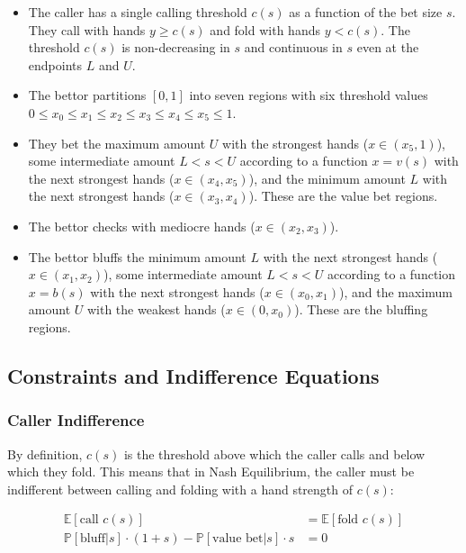 \documentclass[a4paper,12pt]{article}
\theoremstyle{plain}
\theoremstyle{definition}
\begin{document}
\begin{itemize}
    \item The caller has a single calling threshold $c(s)$ as a function of the bet size $s$. They call with hands $y \geq c(s)$ and fold with hands $y < c(s)$. The threshold $c(s)$ is non-decreasing in $s$ and continuous in $s$ even at the endpoints $L$ and $U$.
    \item The bettor partitions $[0, 1]$ into seven regions with six threshold values $0 \leq x_0\leq x_1\leq x_2\leq x_3 \leq x_4 \leq x_5 \leq 1$. 
    \item They bet the maximum amount $U$ with the strongest hands ($x \in (x_5, 1)$), some intermediate amount $L < s < U$ according to a function $x = v(s)$ with the next strongest hands ($x \in (x_4, x_5)$), and the minimum amount $L$ with the next strongest hands ($x \in (x_3, x_4)$). These are the value bet regions.
    \item The bettor checks with mediocre hands ($x \in (x_2, x_3)$).
    \item The bettor bluffs the minimum amount $L$ with the next strongest hands ($x \in (x_1, x_2)$), some intermediate amount $L < s < U$ according to a function $x = b(s)$ with the next strongest hands ($x \in (x_0, x_1)$), and the maximum amount $U$ with the weakest hands ($x \in (0, x_0)$). These are the bluffing regions.
\end{itemize}




\subsection{Constraints and Indifference Equations}

\subsubsection{Caller Indifference}

By definition, $c(s)$ is the threshold above which the caller calls and below which they fold. This means that in Nash Equilibrium, the caller must be indifferent between calling and folding with a hand strength of $c(s)$:

\begin{align*}
    \mathbb{E}[\text{call } c(s)] & = \mathbb{E}[\text{fold } c(s)]\\
    \mathbb{P}[\text{bluff} | s] \cdot (1+s) - \mathbb{P}[\text{value bet} | s]\cdot s & = 0 
\end{align*}
\end{document}
